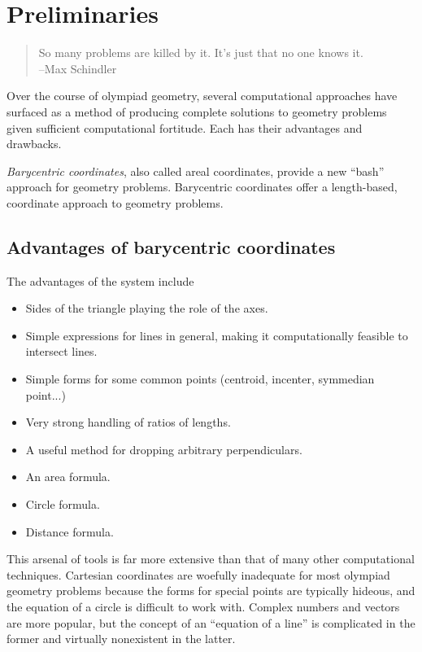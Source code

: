 \chapter{Preliminaries}
\begin{quote}
  So many problems are killed by it.  It's just that no one knows it.
  \\ --Max Schindler
\end{quote}

Over the course of olympiad geometry, several computational approaches have surfaced as a method of producing complete solutions to geometry problems given sufficient computational fortitude.  Each has their advantages and drawbacks.

\textit{Barycentric coordinates}, also called areal coordinates, provide a new ``bash'' approach for geometry problems.  Barycentric coordinates offer a length-based, coordinate approach to geometry problems.

\section{Advantages of barycentric coordinates}
The advantages of the system include
\begin{itemize}
  \item Sides of the triangle playing the role of the axes.
  \item Simple expressions for lines in general, making it computationally feasible to intersect lines.
  \item Simple forms for some common points (centroid, incenter, symmedian point...)
  \item Very strong handling of ratios of lengths.
  \item A useful method for dropping arbitrary perpendiculars.
  \item An area formula.
  \item Circle formula.
  \item Distance formula.
\end{itemize}


This arsenal of tools is far more extensive than that of many other computational techniques.  Cartesian coordinates are woefully inadequate for most olympiad geometry problems because the forms for special points are typically hideous, and the equation of a circle is difficult to work with.  Complex numbers and vectors are more popular, but the concept of an ``equation of a line'' is complicated in the former and virtually nonexistent in the latter.


